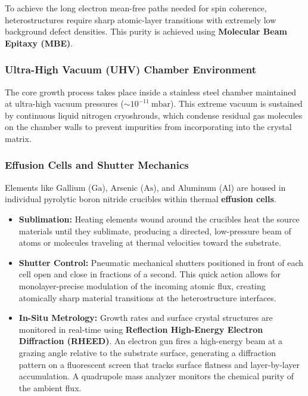\documentclass[
]{article}
\providecommand{\tightlist}{%
  \setlength{\itemsep}{0pt}\setlength{\parskip}{0pt}}
\begin{document}
To achieve the long electron mean-free paths needed for spin coherence,
heterostructures require sharp atomic-layer transitions with extremely
low background defect densities. This purity is achieved using
\textbf{Molecular Beam Epitaxy (MBE)}.

\subsubsection{Ultra-High Vacuum (UHV) Chamber
Environment}\label{ultra-high-vacuum-uhv-chamber-environment}

The core growth process takes place inside a stainless steel chamber
maintained at ultra-high vacuum pressures
(\(\sim 10^{-11}\ \text{mbar}\)). This extreme vacuum is sustained by
continuous liquid nitrogen cryoshrouds, which condense residual gas
molecules on the chamber walls to prevent impurities from incorporating
into the crystal matrix.

\subsubsection{Effusion Cells and Shutter
Mechanics}\label{effusion-cells-and-shutter-mechanics}

Elements like Gallium (\(\text{Ga}\)), Arsenic (\(\text{As}\)), and
Aluminum (\(\text{Al}\)) are housed in individual pyrolytic boron
nitride crucibles within thermal \textbf{effusion cells}.

\begin{itemize}
\tightlist
\item
  \textbf{Sublimation:} Heating elements wound around the crucibles heat
  the source materials until they sublimate, producing a directed,
  low-pressure beam of atoms or molecules traveling at thermal
  velocities toward the substrate.
\item
  \textbf{Shutter Control:} Pneumatic mechanical shutters positioned in
  front of each cell open and close in fractions of a second. This quick
  action allows for monolayer-precise modulation of the incoming atomic
  flux, creating atomically sharp material transitions at the
  heterostructure interfaces.
\item
  \textbf{In-Situ Metrology:} Growth rates and surface crystal
  structures are monitored in real-time using \textbf{Reflection
  High-Energy Electron Diffraction (RHEED)}. An electron gun fires a
  high-energy beam at a grazing angle relative to the substrate surface,
  generating a diffraction pattern on a fluorescent screen that tracks
  surface flatness and layer-by-layer accumulation. A quadrupole mass
  analyzer monitors the chemical purity of the ambient flux.
\end{itemize}
\end{document}
